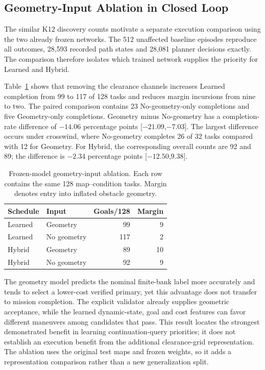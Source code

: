 \subsection{Geometry-Input Ablation in Closed Loop}
The similar K12 discovery counts motivate a separate execution comparison using the two already frozen networks. The 512 unaffected baseline episodes reproduce all outcomes, 28,593 recorded path states and 28,081 planner decisions exactly. The comparison therefore isolates which trained network supplies the priority for Learned and Hybrid.

Table~\ref{tab:geometryablation} shows that removing the clearance channels increases Learned completion from 99 to 117 of 128 tasks and reduces margin incursions from nine to two. The paired comparison contains 23 No-geometry-only completions and five Geometry-only completions. Geometry minus No-geometry has a completion-rate difference of $-14.06$ percentage points [$-21.09$,$-7.03$]. The largest difference occurs under crosswind, where No-geometry completes 26 of 32 tasks compared with 12 for Geometry. For Hybrid, the corresponding overall counts are 92 and 89; the difference is $-2.34$ percentage points [$-12.50$,9.38].

\begin{table}[!t]
\centering\small
\caption{Frozen-model geometry-input ablation. Each row contains the same 128 map--condition tasks. Margin denotes entry into inflated obstacle geometry.}
\label{tab:geometryablation}
\begin{tabular}{llrr}
\toprule
Schedule & Input & Goals/128 & Margin \\
\midrule
Learned & Geometry & 99 & 9 \\
Learned & No geometry & 117 & 2 \\
Hybrid & Geometry & 89 & 10 \\
Hybrid & No geometry & 92 & 9 \\
\bottomrule
\end{tabular}
\end{table}

The geometry model predicts the nominal finite-bank label more accurately and tends to select a lower-cost verified primary, yet this advantage does not transfer to mission completion. The explicit validator already supplies geometric acceptance, while the learned dynamic-state, goal and cost features can favor different maneuvers among candidates that pass. This result locates the strongest demonstrated benefit in learning continuation-query priorities; it does not establish an execution benefit from the additional clearance-grid representation. The ablation uses the original test maps and frozen weights, so it adds a representation comparison rather than a new generalization split.

